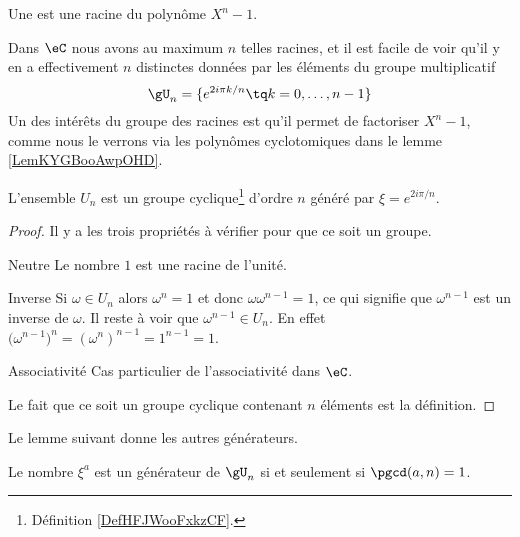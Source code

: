 \begin{definition}
    Une  est une racine du polynôme \( X^n-1\).
\end{definition}

Dans \( \eC\) nous avons au maximum \( n\) telles racines, et il est facile de voir qu'il y en a effectivement \( n\) distinctes données par les éléments du groupe multiplicatif
\begin{equation}        \label{EqIEAXooIpvFPe}
    \gU_n=\{  e^{2i\pi k/n}  \tq k=0,\ldots, n-1 \}
\end{equation}
Un des intérêts du groupe des racines est qu'il permet de factoriser \( X^n-1\), comme nous le verrons via les polynômes cyclotomiques dans le lemme \ref{LemKYGBooAwpOHD}.

\begin{lemma}       \label{LemWHQGooXyeJiw}
    L'ensemble \( U_n\) est un groupe cyclique\footnote{Définition \ref{DefHFJWooFxkzCF}.} d'ordre \( n\) généré par \( \xi= e^{2i\pi/n}\).
\end{lemma}

\begin{proof}
    Il y a les trois propriétés à vérifier pour que ce soit un groupe.
    \begin{subproof}
        \item[Neutre]
            Le nombre \( 1\) est une racine de l'unité.
    \item[Inverse]
        Si \( \omega\in U_n\) alors \( \omega^n=1\) et donc \( \omega\omega^{n-1}=1\), ce qui signifie que \( \omega^{n-1}\) est un inverse de \( \omega\). Il reste à voir que \( \omega^{n-1}\in U_n\). En effet \(  \big( \omega^{n-1} \big)^n=(\omega^n)^{n-1}=1^{n-1}=1  \).
    \item[Associativité]
        Cas particulier de l'associativité dans \( \eC\).
    \end{subproof}
    Le fait que ce soit un groupe cyclique contenant \( n\) éléments est la définition.
\end{proof}


Le lemme suivant donne les autres générateurs.
\begin{lemma}   \label{LemcFTNMa}
    Le nombre \( \xi^a\) est un générateur de \( \gU_n\) si et seulement si \( \pgcd(a,n)=1\).
\end{lemma}

